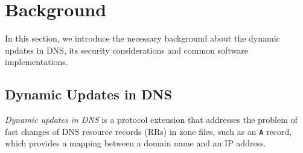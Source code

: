 \section{Background}


In this section, we introduce the necessary background about the dynamic updates in DNS, its security considerations and common software implementations.

\subsection{Dynamic Updates in DNS}
%
\textit{Dynamic updates in DNS} is a protocol extension that addresses the problem of fast changes of DNS resource records (RRs) in zone files, such as an \texttt{A} record, which provides a mapping between a domain name and an IP address.

